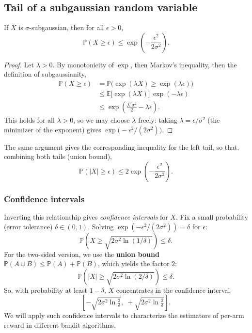 \subsection{Tail of a subgaussian random variable}

\begin{theorem}
If $X$ is $\sigma$-subgaussian, then for all $\epsilon > 0$,
\[
\mathbb{P}(X \geq \epsilon) \leq \exp\left(-\frac{\epsilon^2}{2\sigma^2}\right).
\]
\end{theorem}

\begin{proof}
Let $\lambda > 0$. By monotonicity of $\exp$, then Markov's inequality, then the definition of subgaussianity,
\begin{align*}
\mathbb{P}(X \geq \epsilon) &= \mathbb{P}\big(\exp(\lambda X) \geq \exp(\lambda\epsilon)\big) \\
&\leq \mathbb{E}\big[\exp(\lambda X)\big]\, \exp(-\lambda\epsilon) \\
&\leq \exp\left(\frac{\lambda^2\sigma^2}{2} - \lambda\epsilon\right).
\end{align*}
This holds for all $\lambda > 0$, so we may choose $\lambda$ freely: taking $\lambda = \epsilon/\sigma^2$ (the minimizer of the exponent) gives $\exp\!\big(-\epsilon^2/(2\sigma^2)\big)$.
\end{proof}

The same argument gives the corresponding inequality for the left tail, so that, combining both tails (union bound),
\[
\mathbb{P}(|X| \geq \epsilon) \leq 2\exp\left(-\frac{\epsilon^2}{2\sigma^2}\right).
\]

\subsubsection*{Confidence intervals}

Inverting this relationship gives \emph{confidence intervals} for $X$. Fix a small probability (error tolerance) $\delta \in (0,1)$. Solving $\exp(-\epsilon^2/(2\sigma^2)) = \delta$ for $\epsilon$:
\[
\mathbb{P}\left(X \geq \sqrt{2\sigma^2\ln(1/\delta)}\right) \leq \delta.
\]
For the two-sided version, we use the \textbf{union bound} $\mathbb{P}(A \cup B) \leq \mathbb{P}(A) + \mathbb{P}(B)$, which yields the factor $2$:
\[
\mathbb{P}\left(|X| \geq \sqrt{2\sigma^2\ln(2/\delta)}\right) \leq \delta.
\]
So, with probability at least $1 - \delta$, $X$ concentrates in the confidence interval
\[
\left[-\sqrt{2\sigma^2\ln\tfrac{2}{\delta}},\; +\sqrt{2\sigma^2\ln\tfrac{2}{\delta}}\right].
\]
We will apply such confidence intervals to characterize the estimators of per-arm reward in different bandit algorithms.

